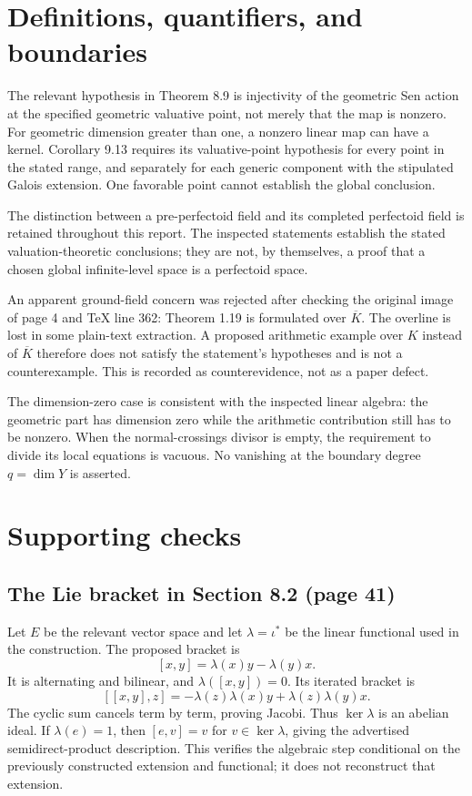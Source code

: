 \documentclass[10pt]{article}
\begin{document}
\section*{Definitions, quantifiers, and boundaries}
The relevant hypothesis in Theorem 8.9 is injectivity of the geometric Sen action at the specified geometric valuative point, not merely that the map is nonzero. For geometric dimension greater than one, a nonzero linear map can have a kernel. Corollary 9.13 requires its valuative-point hypothesis for every point in the stated range, and separately for each generic component with the stipulated Galois extension. One favorable point cannot establish the global conclusion.\par
The distinction between a pre-perfectoid field and its completed perfectoid field is retained throughout this report. The inspected statements establish the stated valuation-theoretic conclusions; they are not, by themselves, a proof that a chosen global infinite-level space is a perfectoid space.\par
An apparent ground-field concern was rejected after checking the original image of page 4 and TeX line 362: Theorem 1.19 is formulated over \(\overline K\). The overline is lost in some plain-text extraction. A proposed arithmetic example over \(K\) instead of \(\overline K\) therefore does not satisfy the statement’s hypotheses and is not a counterexample. This is recorded as counterevidence, not as a paper defect.\par
The dimension-zero case is consistent with the inspected linear algebra: the geometric part has dimension zero while the arithmetic contribution still has to be nonzero. When the normal-crossings divisor is empty, the requirement to divide its local equations is vacuous. No vanishing at the boundary degree \(q=\dim Y\) is asserted.\par
\section*{Supporting checks}
\subsection*{The Lie bracket in Section 8.2 (page 41)}
Let \(E\) be the relevant vector space and let \(\lambda=\iota^*\) be the linear functional used in the construction. The proposed bracket is \[[x,y]=\lambda(x)y-\lambda(y)x .\] It is alternating and bilinear, and \(\lambda([x,y])=0\). Its iterated bracket is \[[[x,y],z]=-\lambda(z)\lambda(x)y+\lambda(z)\lambda(y)x .\] The cyclic sum cancels term by term, proving Jacobi. Thus \(\ker\lambda\) is an abelian ideal. If \(\lambda(e)=1\), then \([e,v]=v\) for \(v\in\ker\lambda\), giving the advertised semidirect-product description. This verifies the algebraic step conditional on the previously constructed extension and functional; it does not reconstruct that extension.\par
\end{document}
